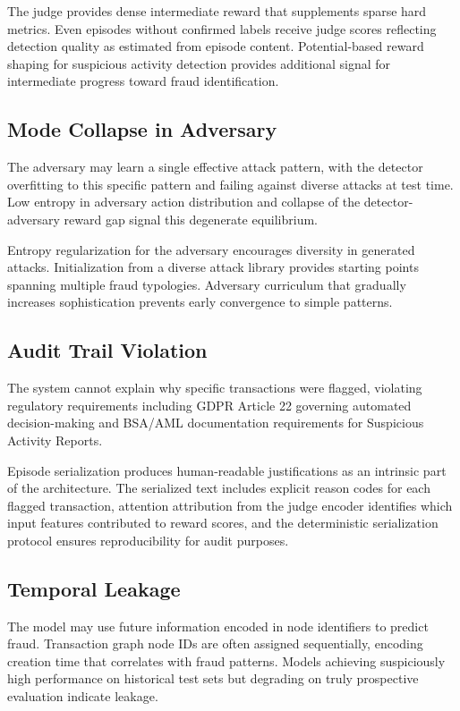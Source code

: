 \documentclass[11pt,a4paper]{article}
\begin{document}
The judge provides dense intermediate reward that supplements sparse hard metrics. Even episodes without confirmed labels receive judge scores reflecting detection quality as estimated from episode content. Potential-based reward shaping for suspicious activity detection provides additional signal for intermediate progress toward fraud identification.

\subsection{Mode Collapse in Adversary}

The adversary may learn a single effective attack pattern, with the detector overfitting to this specific pattern and failing against diverse attacks at test time. Low entropy in adversary action distribution and collapse of the detector-adversary reward gap signal this degenerate equilibrium.

Entropy regularization for the adversary encourages diversity in generated attacks. Initialization from a diverse attack library provides starting points spanning multiple fraud typologies. Adversary curriculum that gradually increases sophistication prevents early convergence to simple patterns.

\subsection{Audit Trail Violation}

The system cannot explain why specific transactions were flagged, violating regulatory requirements including GDPR Article 22 governing automated decision-making and BSA/AML documentation requirements for Suspicious Activity Reports.

Episode serialization produces human-readable justifications as an intrinsic part of the architecture. The serialized text includes explicit reason codes for each flagged transaction, attention attribution from the judge encoder identifies which input features contributed to reward scores, and the deterministic serialization protocol ensures reproducibility for audit purposes.

\subsection{Temporal Leakage}

The model may use future information encoded in node identifiers to predict fraud. Transaction graph node IDs are often assigned sequentially, encoding creation time that correlates with fraud patterns. Models achieving suspiciously high performance on historical test sets but degrading on truly prospective evaluation indicate leakage.
\end{document}
